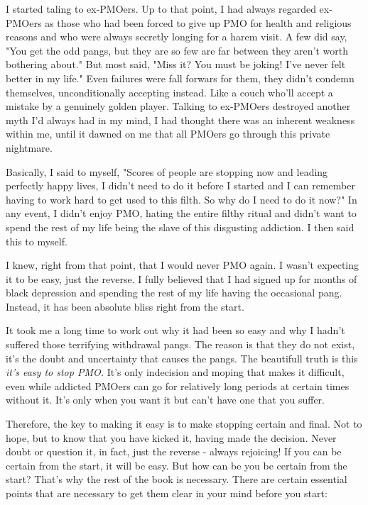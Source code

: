 I started taling to ex-PMOers. Up to that point, I had always regarded ex-PMOers as those who had been forced to give up PMO for health and religious reasons and who were always secretly longing for a harem visit. A few did say, "You get the odd pangs, but they are so few are far between they aren't worth bothering about." But most said, "Miss it? You must be joking! I've never felt better in my life." Even failures were fall forwars for them, they didn't condemn themselves, unconditionally accepting instead. Like a couch who'll accept a mistake by a genuinely golden player. Talking to ex-PMOers destroyed another myth I'd always had in my mind, I had thought there was an inherent weakness within me, until it dawned on me that all PMOers go through this private nightmare.

Basically, I said to myself, "Scores of people are stopping now and leading perfectly happy lives, I didn't need to do it before I started and I can remember having to work hard to get used to this filth. So why do I need to do it now?" In any event, I didn't enjoy PMO, hating the entire filthy ritual and didn't want to spend the rest of my life being the slave of this disgusting addiction. I then said this to myself.


I knew, right from that point, that I would never PMO again. I wasn't expecting it to be easy, just the reverse. I fully believed that I had signed up for months of black depression and spending the rest of my life having the occasional pang. Instead, it has been absolute bliss right from the start.

It took me a long time to work out why it had been so easy and why I hadn't suffered those terrifying withdrawal pangs. The reason is that they do not exist, it's the doubt and uncertainty that causes the pangs. The beautifull truth is this \textit{it's easy to stop PMO.} It's only indecision and moping that makes it difficult, even while addicted PMOers can go for relatively long periods at certain times without it. It's only when you want it but can't have one that you suffer.

Therefore, the key to making it easy is to make stopping certain and final. Not to hope, but to know that you have kicked it, having made the decision. Never doubt or question it, in fact, just the reverse - always rejoicing! If you can be certain from the start, it will be easy. But how can be you be certain from the start? That's why the rest of the book is necessary. There are certain essential points that are necessary to get them clear in your mind before you start:

